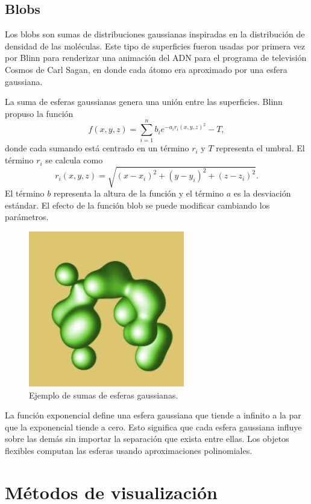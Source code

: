 \subsection{Blobs}

Los blobs son sumas de distribuciones gaussianas inspiradas en la distribución de densidad de las moléculas. Este tipo de superficies fueron usadas por primera vez por Blinn \cite{Blinn82} para renderizar una animación del ADN para el programa de televisión Cosmos de Carl Sagan, en donde cada átomo era aproximado por una esfera gaussiana.

La suma de esferas gaussianas genera una unión entre las superficies. Blinn propuso la función
\begin{equation}
f(x,y,z) = \sum_{i=1}^{n} b_i e^{-a_i r_i(x,y,z)^2} - T,
\nonumber
\end{equation}
donde cada sumando está centrado en un término $r_i$ y $T$ representa el umbral. El término $r_i$ se calcula como
$$r_i(x,y,z) = \sqrt{(x - x_i)^2 + (y-y_i)^2 + (z-z_i)^2}.$$
El término $b$ representa la altura de la función y el término $a$ es la desviación estándar. El efecto de la función blob se puede modificar cambiando los parámetros.
\begin{figure}[h]
	\centering
	\includegraphics[scale=0.7]{images/florez3.png}
	\caption{Ejemplo de sumas de esferas gaussianas.}
\end{figure}

La función exponencial define una esfera gaussiana que tiende a infinito a la par que la exponencial tiende a cero. Esto significa que cada esfera gaussiana influye sobre las demás sin importar la separación que exista entre ellas. Los objetos flexibles\cite{Wyvill86} computan las esferas usando aproximaciones polinomiales.
\newpage
\section{Métodos de visualización}

